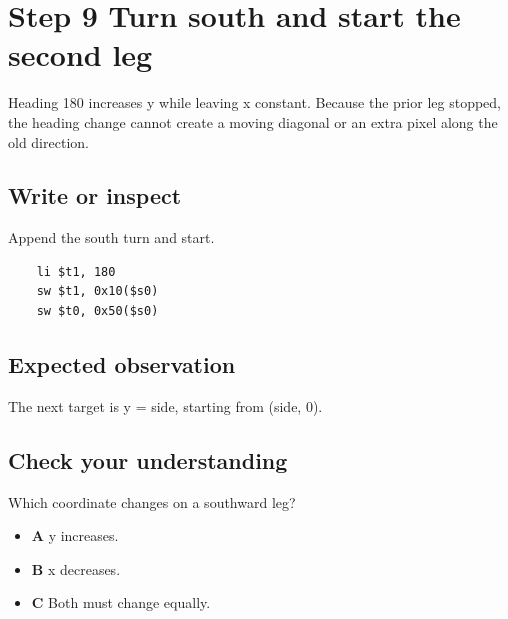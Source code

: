 \section{Step 9 Turn south and start the second
  leg}\label{006-marsbot-square-s09-step-9-turn-south-and-start-the-second-leg}

Heading 180 increases y while leaving x constant. Because the prior leg
stopped, the heading change cannot create a moving diagonal or an extra
pixel along the old direction.

\subsection{Write or
  inspect}\label{006-marsbot-square-s09-write-or-inspect}

Append the south turn and start.

\begin{verbatim}
    li $t1, 180
    sw $t1, 0x10($s0)
    sw $t0, 0x50($s0)
\end{verbatim}

\subsection{Expected
  observation}\label{006-marsbot-square-s09-expected-observation}

The next target is y = side, starting from (side, 0).

\subsection{Check your
  understanding}\label{006-marsbot-square-s09-check-your-understanding}

Which coordinate changes on a southward leg?

\begin{itemize}
  \tightlist
  \item
        \textbf{A} y increases.
  \item
        \textbf{B} x decreases.
  \item
        \textbf{C} Both must change equally.
\end{itemize}
